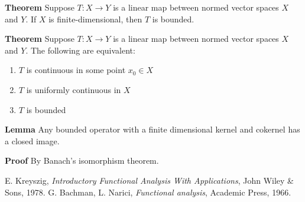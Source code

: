 \documentclass[12pt]{article}
\newcounter{123listctr}
\newcounter{123listcolonstylectr}
\begin{document}
{\bf Theorem} \cite{kreyszig, bachman} Suppose $T : X \to Y$ is a
linear map between normed vector spaces $X$ and $Y$. If $X$ is finite-dimensional, then $T$ is bounded.

{\bf Theorem} Suppose $T : X \to Y$ is a
linear map between normed vector spaces $X$ and $Y$. The following are equivalent:
\begin{enumerate}
\item $T$ is continuous in some point $x_{0} \in X$
\item $T$ is uniformly continuous in $X$
\item $T$ is bounded
\end{enumerate}

{\bf Lemma} Any bounded operator with a finite dimensional kernel and cokernel has a closed image.

{\bf Proof} By Banach's isomorphism theorem.

\begin{thebibliography}{9}
  E. Kreyszig,
 \emph{Introductory Functional Analysis With Applications},
 John Wiley \& Sons, 1978.
 G. Bachman, L. Narici, \emph{Functional analysis}, Academic Press, 1966.
 \end{thebibliography}
\end{document}
